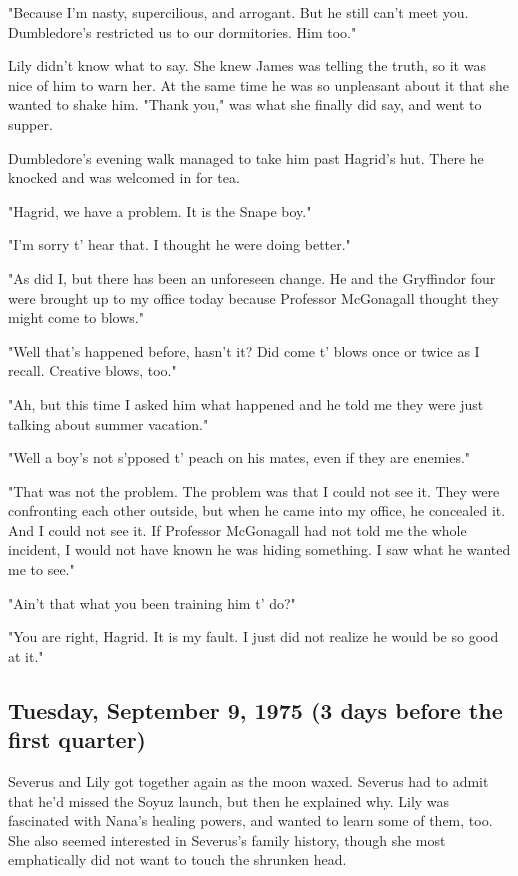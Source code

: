 "Because I'm nasty, supercilious, and arrogant. But he still can't meet you. Dumbledore's restricted us to our dormitories. Him too."

Lily didn't know what to say. She knew James was telling the truth, so it was nice of him to warn her. At the same time he was so unpleasant about it that she wanted to shake him. "Thank you," was what she finally did say, and went to supper.

Dumbledore's evening walk managed to take him past Hagrid's hut. There he knocked and was welcomed in for tea.

"Hagrid, we have a problem. It is the Snape boy."

"I'm sorry t' hear that. I thought he were doing better."

"As did I, but there has been an unforeseen change. He and the Gryffindor four were brought up to my office today because Professor McGonagall thought they might come to blows."

"Well that's happened before, hasn't it? Did come t' blows once or twice as I recall. Creative blows, too."

"Ah, but this time I asked him what happened and he told me they were just talking about summer vacation."

"Well a boy's not s'pposed t' peach on his mates, even if they are enemies."

"That was not the problem. The problem was that I could not see it. They were confronting each other outside, but when he came into my office, he concealed it. And I could not see it. If Professor McGonagall had not told me the whole incident, I would not have known he was hiding something. I saw what he wanted me to see."

"Ain't that what you been training him t' do?"

"You are right, Hagrid. It is my fault. I just did not realize he would be so good at it."

\subsection{Tuesday, September 9, 1975 (3 days before the first quarter)}

Severus and Lily got together again as the moon waxed. Severus had to admit that he'd missed the Soyuz launch, but then he explained why. Lily was fascinated with Nana's healing powers, and wanted to learn some of them, too. She also seemed interested in Severus's family history, though she most emphatically did not want to touch the shrunken head.


